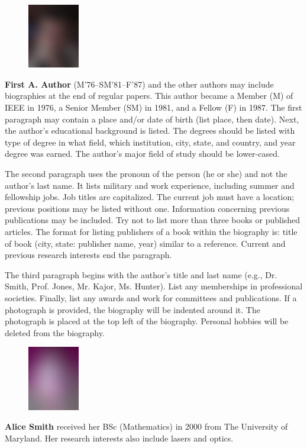 \documentclass[9pt,twocolumn,twoside]{osajnl}
\begin{document}
\setlength\intextsep{0pt}

\begin{figure}
\includegraphics[width=0.20\textwidth]{johnsmith}
\end{figure}

\medskip

\noindent \textbf{First A. Author} (M’76–SM’81–F’87) and the other authors may include biographies at the end of regular papers. This author became a Member (M) of IEEE in 1976, a Senior Member (SM) in 1981, and a Fellow (F) in 1987. The first paragraph may contain a place and/or date of birth (list place, then date). Next, the author’s educational background is listed. The degrees should be listed with type of degree in what field, which institution, city, state, and country, and year degree was earned. The author’s major field of study should be lower-cased.
  
The second paragraph uses the pronoun of the person (he or she) and not the author’s last name. It lists military and work experience, including summer and fellowship jobs. Job titles are capitalized. The current job must have a location; previous positions may be listed without one. Information concerning previous publications may be included. Try not to list more than three books or published articles. The format for listing publishers of a book within the biography is: title of book (city, state: publisher name, year) similar to a reference. Current and previous research interests end the paragraph.

The third paragraph begins with the author’s title and last name (e.g., Dr. Smith, Prof. Jones, Mr. Kajor, Ms. Hunter). List any memberships in professional societies. Finally, list any awards and work for committees and publications.  If a photograph is provided, the biography will be indented around it. The photograph is placed at the top left of the biography. Personal hobbies will be deleted from the biography.

\medskip

  \begin{figure}
     \includegraphics[width=0.2\textwidth]{alicesmith}
   \end{figure}
   \noindent
   \textbf{Alice Smith} received her BSc (Mathematics) in 2000 from The University of Maryland. Her research interests also include lasers and optics.
  
\end{document}
